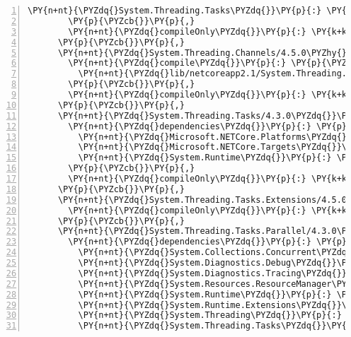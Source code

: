 \begin{Verbatim}[commandchars=\\\{\},numbers=left,firstnumber=1,stepnumber=1,numberblanklines=0]
          \PY{n+nt}{\PYZdq{}System.Threading.Tasks\PYZdq{}}\PY{p}{:} \PY{l+s+s2}{\PYZdq{}4.3.0\PYZdq{}}
        \PY{p}{\PYZcb{}}\PY{p}{,}
        \PY{n+nt}{\PYZdq{}compileOnly\PYZdq{}}\PY{p}{:} \PY{k+kc}{true}
      \PY{p}{\PYZcb{}}\PY{p}{,}
      \PY{n+nt}{\PYZdq{}System.Threading.Channels/4.5.0\PYZhy{}rc1\PYZdq{}}\PY{p}{:} \PY{p}{\PYZob{}}
        \PY{n+nt}{\PYZdq{}compile\PYZdq{}}\PY{p}{:} \PY{p}{\PYZob{}}
          \PY{n+nt}{\PYZdq{}lib/netcoreapp2.1/System.Threading.Channels.dll\PYZdq{}}\PY{p}{:} \PY{p}{\PYZob{}}\PY{p}{\PYZcb{}}
        \PY{p}{\PYZcb{}}\PY{p}{,}
        \PY{n+nt}{\PYZdq{}compileOnly\PYZdq{}}\PY{p}{:} \PY{k+kc}{true}
      \PY{p}{\PYZcb{}}\PY{p}{,}
      \PY{n+nt}{\PYZdq{}System.Threading.Tasks/4.3.0\PYZdq{}}\PY{p}{:} \PY{p}{\PYZob{}}
        \PY{n+nt}{\PYZdq{}dependencies\PYZdq{}}\PY{p}{:} \PY{p}{\PYZob{}}
          \PY{n+nt}{\PYZdq{}Microsoft.NETCore.Platforms\PYZdq{}}\PY{p}{:} \PY{l+s+s2}{\PYZdq{}2.1.0\PYZhy{}rc1\PYZdq{}}\PY{p}{,}
          \PY{n+nt}{\PYZdq{}Microsoft.NETCore.Targets\PYZdq{}}\PY{p}{:} \PY{l+s+s2}{\PYZdq{}2.1.0\PYZhy{}rc1\PYZdq{}}\PY{p}{,}
          \PY{n+nt}{\PYZdq{}System.Runtime\PYZdq{}}\PY{p}{:} \PY{l+s+s2}{\PYZdq{}4.3.0\PYZdq{}}
        \PY{p}{\PYZcb{}}\PY{p}{,}
        \PY{n+nt}{\PYZdq{}compileOnly\PYZdq{}}\PY{p}{:} \PY{k+kc}{true}
      \PY{p}{\PYZcb{}}\PY{p}{,}
      \PY{n+nt}{\PYZdq{}System.Threading.Tasks.Extensions/4.5.0\PYZhy{}rc1\PYZdq{}}\PY{p}{:} \PY{p}{\PYZob{}}
        \PY{n+nt}{\PYZdq{}compileOnly\PYZdq{}}\PY{p}{:} \PY{k+kc}{true}
      \PY{p}{\PYZcb{}}\PY{p}{,}
      \PY{n+nt}{\PYZdq{}System.Threading.Tasks.Parallel/4.3.0\PYZdq{}}\PY{p}{:} \PY{p}{\PYZob{}}
        \PY{n+nt}{\PYZdq{}dependencies\PYZdq{}}\PY{p}{:} \PY{p}{\PYZob{}}
          \PY{n+nt}{\PYZdq{}System.Collections.Concurrent\PYZdq{}}\PY{p}{:} \PY{l+s+s2}{\PYZdq{}4.3.0\PYZdq{}}\PY{p}{,}
          \PY{n+nt}{\PYZdq{}System.Diagnostics.Debug\PYZdq{}}\PY{p}{:} \PY{l+s+s2}{\PYZdq{}4.3.0\PYZdq{}}\PY{p}{,}
          \PY{n+nt}{\PYZdq{}System.Diagnostics.Tracing\PYZdq{}}\PY{p}{:} \PY{l+s+s2}{\PYZdq{}4.3.0\PYZdq{}}\PY{p}{,}
          \PY{n+nt}{\PYZdq{}System.Resources.ResourceManager\PYZdq{}}\PY{p}{:} \PY{l+s+s2}{\PYZdq{}4.3.0\PYZdq{}}\PY{p}{,}
          \PY{n+nt}{\PYZdq{}System.Runtime\PYZdq{}}\PY{p}{:} \PY{l+s+s2}{\PYZdq{}4.3.0\PYZdq{}}\PY{p}{,}
          \PY{n+nt}{\PYZdq{}System.Runtime.Extensions\PYZdq{}}\PY{p}{:} \PY{l+s+s2}{\PYZdq{}4.3.0\PYZdq{}}\PY{p}{,}
          \PY{n+nt}{\PYZdq{}System.Threading\PYZdq{}}\PY{p}{:} \PY{l+s+s2}{\PYZdq{}4.3.0\PYZdq{}}\PY{p}{,}
          \PY{n+nt}{\PYZdq{}System.Threading.Tasks\PYZdq{}}\PY{p}{:} \PY{l+s+s2}{\PYZdq{}4.3.0\PYZdq{}}

\end{Verbatim}
